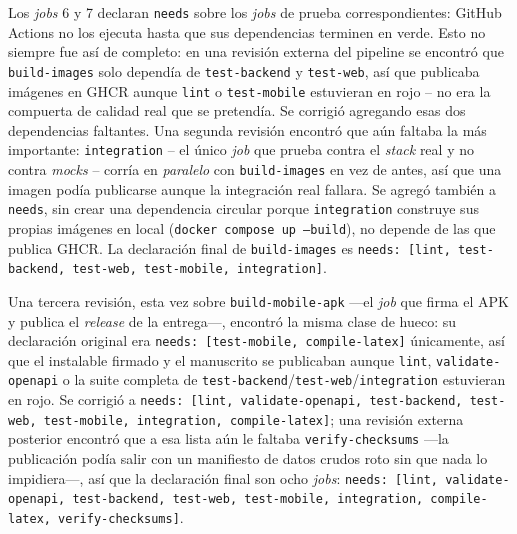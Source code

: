 Los \emph{jobs} 6 y 7 declaran \texttt{needs} sobre los \emph{jobs} de prueba correspondientes:
GitHub Actions no los ejecuta hasta que sus dependencias terminen en verde. Esto no siempre fue
así de completo: en una revisión externa del pipeline se encontró que \texttt{build-images} solo
dependía de \texttt{test-backend} y \texttt{test-web}, así que publicaba imágenes en GHCR aunque
\texttt{lint} o \texttt{test-mobile} estuvieran en rojo -- no era la compuerta de calidad real que
se pretendía. Se corrigió agregando esas dos dependencias faltantes. Una segunda revisión
encontró que aún faltaba la más importante: \texttt{integration} -- el único \emph{job} que
prueba contra el \emph{stack} real y no contra \emph{mocks} -- corría en \emph{paralelo} con
\texttt{build-images} en vez de antes, así que una imagen podía publicarse aunque la integración
real fallara. Se agregó también a \texttt{needs}, sin crear una dependencia circular porque
\texttt{integration} construye sus propias imágenes en local (\texttt{docker compose up
--build}), no depende de las que publica GHCR. La declaración final de \texttt{build-images} es
\texttt{needs: [lint, test-backend, test-web, test-mobile, integration]}.

Una tercera revisión, esta vez sobre \texttt{build-mobile-apk} —el \emph{job} que firma el APK y
publica el \emph{release} de la entrega—, encontró la misma clase de hueco: su declaración
original era \texttt{needs: [test-mobile, compile-latex]} únicamente, así que el instalable
firmado y el manuscrito se publicaban aunque \texttt{lint}, \texttt{validate-openapi} o la suite
completa de \texttt{test-backend}/\texttt{test-web}/\texttt{integration} estuvieran en rojo. Se
corrigió a \texttt{needs: [lint, validate-openapi, test-backend, test-web, test-mobile,
integration, compile-latex]}; una revisión externa posterior encontró que a esa lista aún le
faltaba \texttt{verify-checksums} —la publicación podía salir con un manifiesto de datos crudos
roto sin que nada lo impidiera—, así que la declaración final son ocho \emph{jobs}:
\texttt{needs: [lint, validate-openapi, test-backend, test-web, test-mobile, integration,
compile-latex, verify-checksums]}.

